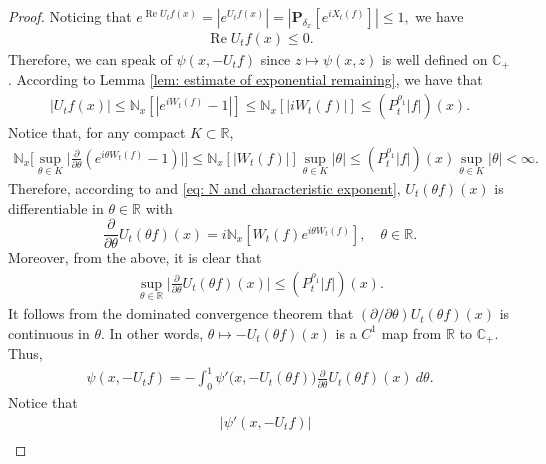 \documentclass[12pt,a4paper]{amsart}
\theoremstyle{plain}
\theoremstyle{definition}
\numberwithin{equation}{section}
\begin{document}
\begin{proof}
  Noticing that
 $
     e^{\operatorname{Re} U_tf(x)}
    = |e^{U_tf(x)}|
    = |\mathbf P_{\delta_x}[e^{i X_t(f)}]|
    \leq 1,
$
  we have
  \begin{align}
    \label{eq: -v has positive real part}
    \operatorname{Re} U_tf(x)
    \leq 0.
  \end{align}
  Therefore, we can speak of $\psi(x,-U_tf)$ since $z\mapsto \psi(x,z)$ is well defined on $\mathbb C_+$.
  According to Lemma \ref{lem: estimate of exponential remaining}, we have that
  \begin{align}
    \label{eq: upper bound for vf}
    |U_tf(x)|
    \leq \mathbb N_x[|e^{i W_t(f)} - 1|]
    \leq \mathbb N_x[|i W_t(f)|]
    \leq (P^{\rho_1}_t |f|)(x).
  \end{align}
  Notice that, for any compact $K \subset \mathbb R$,
  \begin{align}
    \label{eq: estimate of deriavetive of v(theta)}
    \mathbb N_x \Big[\sup_{\theta \in K} \Big|\frac{\partial}{\partial \theta} (e^{i\theta W_t(f)} - 1) \Big|\Big]
    \leq \mathbb N_x[|W_t(f)|] \sup_{\theta \in K}|\theta|
    \leq (P^{\rho_1}_t |f|)(x) \sup_{\theta \in K}|\theta| < \infty.
  \end{align}
  Therefore, according to \cite[Theorem A.5.2]{Durrett2010Probability} and \eqref{eq: N and characteristic exponent}, $ U_t( \theta f)( x )$ is differentiable in $\theta \in \mathbb R$ with
  \[
    \frac{\partial}{\partial \theta} U_t(\theta f)(x)
    = i\mathbb N_x[W_t(f) e^{i\theta W_t(f)}],
    \quad \theta \in \mathbb R.
  \]
  Moreover, from the above, it is clear that
  \begin{align}
    \label{eq: upper bounded for derivative of v(theta)}
    \sup_{\theta \in \mathbb R}\Big| \frac{\partial}{\partial \theta}U_t(\theta f)(x)\Big|
    \leq ( P^{\rho_1}_t |f|)(x).
  \end{align}
  It follows from the dominated convergence theorem that $(\partial/\partial \theta)U_t(\theta f)(x)$ is continuous in $\theta$.
  In other words, $\theta \mapsto -U_t(\theta f)(x)$ is a $C^1$ map from $\mathbb R$ to $\mathbb C_+$.
  Thus,
  \begin{align}
    \label{eq: path integration representation of psi(v)}
    \psi(x,-U_tf)
    = -\int_0^1 \psi'\big(x,-U_t(\theta f)\big) \frac{\partial}{\partial \theta} U_t(\theta f)(x)~d\theta.
  \end{align}
  Notice that
  \begin{align}
    & |\psi'(x, -U_tf)| \\

\end{align}
\end{proof}
\end{document}
